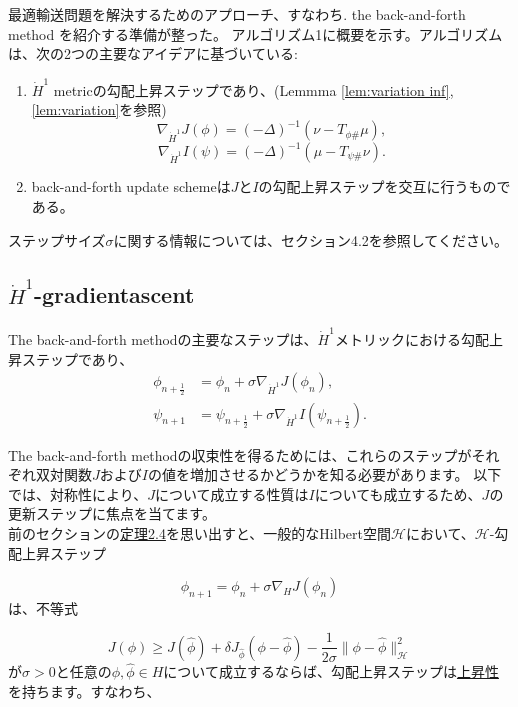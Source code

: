 \documentclass{jsarticle}
\theoremstyle{definition}
\begin{document}
\vspace\baselineskip
最適輸送問題を解決するためのアプローチ、すなわち. the back-and-forth method を紹介する準備が整った。
アルゴリズム1に概要を示す。アルゴリズムは、次の2つの主要なアイデアに基づいている:

\begin{enumerate}
  \item $\dot{H}^1$ metricの勾配上昇ステップであり、(Lemmma \ref{lem:variation inf}, \ref{lem:variation}を参照)
        $$
        \nabla_{\dot{H}^1} J(\phi) = (- \Delta)^{-1} (\nu - T_{\phi \#} \mu),
        $$
        \begin{equation}
          \nabla_{\dot{H}^1} I(\psi) = (- \Delta)^{-1} (\mu - T_{\psi \#} \nu).
        \end{equation}
  
  \item back-and-forth update schemeは$J$と$I$の勾配上昇ステップを交互に行うものである。
\end{enumerate}

ステップサイズ$\sigma$に関する情報については、セクション4.2を参照してください。


\subsection{$\dot{H}^1$-gradientascent}
\label{sect:H1-gradient ascent}
The back-and-forth methodの主要なステップは、$\dot{H}^1$メトリックにおける勾配上昇ステップであり、
\begin{align*}
\phi_{n + \frac{1}{2}} &= \phi_n + \sigma \nabla_{\dot{H}^1} J(\phi_n), \\
\psi_{n + 1} &= \psi_{n + \frac{1}{2}} + \sigma \nabla_{\dot{H}^1} I(\psi_{n + \frac{1}{2}}).
\end{align*}

The back-and-forth methodの収束性を得るためには、これらのステップがそれぞれ双対関数$J$および$I$の値を増加させるかどうかを知る必要があります。
以下では、対称性により、$J$について成立する性質は$I$についても成立するため、$J$の更新ステップに焦点を当てます。\\



前のセクションの\hyperlink{定理2.4}{定理2.4}を思い出すと、一般的なHilbert空間$\mathcal{H} $において、$\mathcal{H}$-勾配上昇ステップ

$$\phi_{n+1}=\phi_n+\sigma\nabla_H J(\phi_n)$$
は、不等式

\begin{equation}
  \label{eq:variation ascent}
  J(\phi)\geq J(\hat{\phi})+\delta J _{\hat{\phi}}(\phi-\hat{\phi})-\frac{1}{2\sigma}\|\phi-\hat{\phi}\|_{\mathcal{H}}^2
\end{equation}
が$\sigma>0$と任意の$\phi,\hat{\phi}\in H$について成立するならば、勾配上昇ステップは\hyperlink{上昇性}{上昇性}を持ちます。すなわち、
\end{document}
